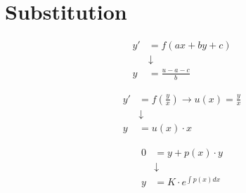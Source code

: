 \section{Substitution}

\begin{center}
\begin{align*}[box=\widebox]
y' &= f(ax+by+c) \\
&\downarrow \\
y &= \frac{u-a-c}{b}
\end{align*}
\end{center}

\begin{center}
\begin{align*}[box=\widebox]
y' &= f\left(\frac{y}{x}\right) \rightarrow u(x)=\frac{y}{x}\\
&\downarrow \\
y &= u(x)\cdot x
\end{align*}
\end{center}

\begin{center}
\begin{align*}[box=\widebox]
0 &= y + p(x)\cdot y \\
&\downarrow \\
y &= K\cdot e^{\int p(x)dx}
\end{align*}
\end{center}